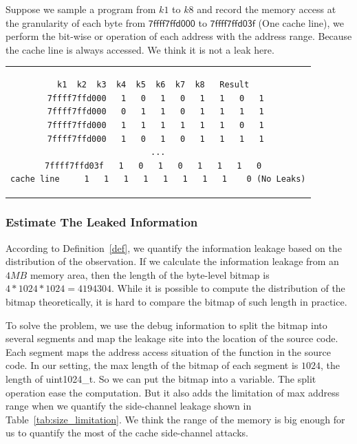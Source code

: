 \begin{myexample}
Suppose we sample a program from $k1$ to $k8$ and record the memory access at the granularity of each byte from $\mathsf{7ffff7ffd000}$ to $\mathsf{7ffff7ffd03f}$ (One cache line), we perform the bit-wise or operation of each address with the address range. Because the cache line is always accessed. We think it is not a leak here.
\begin{center}
  \begin{tabular}{c}
    {
      \begin{lstlisting}[frame=none]
              k1  k2  k3  k4  k5  k6  k7  k8   Result  
7ffff7ffd000   1   0   1   0   1   1   0   1 
7ffff7ffd000   0   1   1   0   1   1   1   1 
7ffff7ffd000   1   1   1   1   1   1   0   1 
7ffff7ffd000   1   0   1   0   1   1   1   1 
...
7ffff7ffd03f   1   0   1   0   1   1   1   0  
cache line     1   1   1   1   1   1   1   1    0 (No Leaks)
\end{lstlisting}
    }
  \end{tabular}
\end{center}
\end{myexample}

\subsubsection{Estimate The Leaked Information}
According to Definition~\ref{def}, we quantify the information leakage based on the distribution of the observation. If we calculate the information leakage from an $4MB$ memory area, then the length of the byte-level bitmap is $4*1024*1024 = 4194304$. While it is possible to compute the distribution of the bitmap theoretically, it is hard to compare the bitmap of such length in practice.

To solve the problem, we use the debug information to split the bitmap into several segments and map the leakage site into the location of the source code. Each segment maps the address access situation of the function in the source code. In our setting, the max length of the bitmap of each segment is $1024$, the length of \textsf{uint1024\_t}. So we can put the bitmap into a variable. The split operation ease the computation. But it also adds the limitation of max address range when we quantify the side-channel leakage shown in Table~\ref{tab:size_limitation}. We think the range of the memory is big enough for us to quantify the most of the cache side-channel attacks.

\begin{table}[h]
  \centering
  \caption{The maximum range address range when we quantify the amount of the leakage with different granularity.}
  \label{tab:size_limitation}
\end{table}

